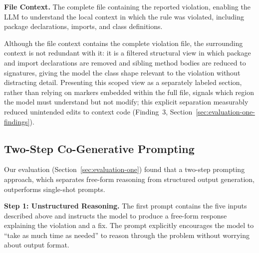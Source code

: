 \textbf{File Context.} The complete file containing the reported violation, enabling the LLM to understand the local context in which the rule was violated, including package declarations, imports, and class definitions.

Although the file context contains the complete violation file, the
surrounding context is not redundant with it: it is a filtered
structural view in which package and import declarations are removed
and sibling method bodies are reduced to signatures, giving the model
the class shape relevant to the violation without distracting detail.
Presenting this scoped view as a separately labeled section, rather
than relying on markers embedded within the full file, signals which
region the model must understand but not modify; this explicit
separation measurably reduced unintended edits to context code
(Finding~3, Section~\ref{sec:evaluation-one-findings}). 



\subsection{Two-Step Co-Generative Prompting}
\label{sec:two-step-prompting}
Our evaluation (Section~\ref{sec:evaluation-one}) found that a two-step prompting approach, which separates free-form reasoning from structured output generation, outperforms single-shot prompts.

\textbf{Step 1: Unstructured Reasoning.} The first prompt contains the five inputs described above and instructs the model to produce a free-form response explaining the violation and a fix. The prompt explicitly encourages the model to ``take as much time as needed'' to reason through the problem without worrying about output format.


